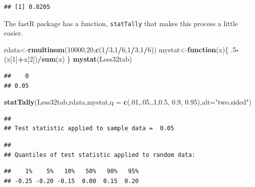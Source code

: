 \documentclass[]{book}
\newenvironment{Shaded}{\begin{snugshade}}{\end{snugshade}}
\newcommand{\KeywordTok}[1]{\textcolor[rgb]{0.13,0.29,0.53}{\textbf{#1}}}
\newcommand{\DataTypeTok}[1]{\textcolor[rgb]{0.13,0.29,0.53}{#1}}
\newcommand{\DecValTok}[1]{\textcolor[rgb]{0.00,0.00,0.81}{#1}}
\newcommand{\FloatTok}[1]{\textcolor[rgb]{0.00,0.00,0.81}{#1}}
\newcommand{\StringTok}[1]{\textcolor[rgb]{0.31,0.60,0.02}{#1}}
\newcommand{\ControlFlowTok}[1]{\textcolor[rgb]{0.13,0.29,0.53}{\textbf{#1}}}
\newcommand{\OperatorTok}[1]{\textcolor[rgb]{0.81,0.36,0.00}{\textbf{#1}}}
\newcommand{\NormalTok}[1]{#1}
\theoremstyle{definition}
\theoremstyle{definition}
\theoremstyle{definition}
\theoremstyle{remark}
\begin{document}
\begin{verbatim}
## [1] 0.8205
\end{verbatim}

The fastR package has a function, \texttt{statTally} that makes this
process a little easier.

\begin{Shaded}
\begin{Highlighting}[]
\NormalTok{rdata<-}\KeywordTok{rmultinom}\NormalTok{(}\DecValTok{10000}\NormalTok{,}\DecValTok{20}\NormalTok{,}\KeywordTok{c}\NormalTok{(}\DecValTok{1}\OperatorTok{/}\DecValTok{3}\NormalTok{,}\DecValTok{1}\OperatorTok{/}\DecValTok{6}\NormalTok{,}\DecValTok{1}\OperatorTok{/}\DecValTok{3}\NormalTok{,}\DecValTok{1}\OperatorTok{/}\DecValTok{6}\NormalTok{))}
\NormalTok{mystat<-}\ControlFlowTok{function}\NormalTok{(x)\{}
\NormalTok{    .}\DecValTok{5}\OperatorTok{-}\NormalTok{(x[}\DecValTok{1}\NormalTok{]}\OperatorTok{+}\NormalTok{x[}\DecValTok{2}\NormalTok{])}\OperatorTok{/}\KeywordTok{sum}\NormalTok{(x)}
\NormalTok{\}}
\KeywordTok{mystat}\NormalTok{(Less32tab)}
\end{Highlighting}
\end{Shaded}

\begin{verbatim}
##    0 
## 0.05
\end{verbatim}

\begin{Shaded}
\begin{Highlighting}[]
\KeywordTok{statTally}\NormalTok{(Less32tab,rdata,mystat,}\DataTypeTok{q =} \KeywordTok{c}\NormalTok{(.}\DecValTok{01}\NormalTok{,.}\DecValTok{05}\NormalTok{,.}\DecValTok{1}\NormalTok{,}\FloatTok{0.5}\NormalTok{, }\FloatTok{0.9}\NormalTok{, }\FloatTok{0.95}\NormalTok{),}\DataTypeTok{alt=}\StringTok{"two.sided"}\NormalTok{)}
\end{Highlighting}
\end{Shaded}

\begin{verbatim}
## 
## Test statistic applied to sample data =  0.05
\end{verbatim}

\begin{verbatim}
## 
## Quantiles of test statistic applied to random data:
\end{verbatim}

\begin{verbatim}
##    1%    5%   10%   50%   90%   95% 
## -0.25 -0.20 -0.15  0.00  0.15  0.20
\end{verbatim}
\end{document}
